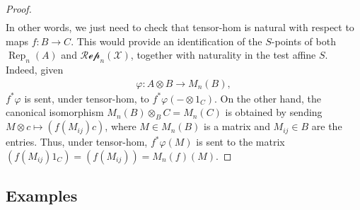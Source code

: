 \documentclass{article}
\numberwithin{equation}{section}
\theoremstyle{quest}
\theoremstyle{definition}
\theoremstyle{remark}
\DeclareMathOperator{\Rep}{Rep}
\begin{document}
\begin{proof}
\begin{align*}
	\end{align*} 
	In other words, we just need to check that tensor-hom is natural with respect to maps $f:B\to C$. This would provide an identification of the $S$-points of both $\Rep_n(A)$ and $\mathscr{Rep}_n(\mathcal{X})$, together with naturality in the test affine $S$. Indeed, given
	\begin{align*}
		\varphi:A\otimes B\to M_n(B),
	\end{align*} 
	$f^*\varphi$ is sent, under tensor-hom, to $f^*\varphi(-\otimes 1_C)$. On the other hand, the canonical isomorphism $M_n(B)\otimes _BC=M_n(C)$ is obtained by sending $M\otimes c\mapsto (f(M_{ij})c)$, where $M \in M_n(B)$ is a matrix and $M_{ij}\in B$ are the entries. Thus, under tensor-hom, $f^*\varphi(M)$ is sent to the matrix $(f(M_{ij})1_C)=(f(M_{ij}))=M_n(f)(M)$.
\end{proof} 


\subsection{Examples}
\end{document}
